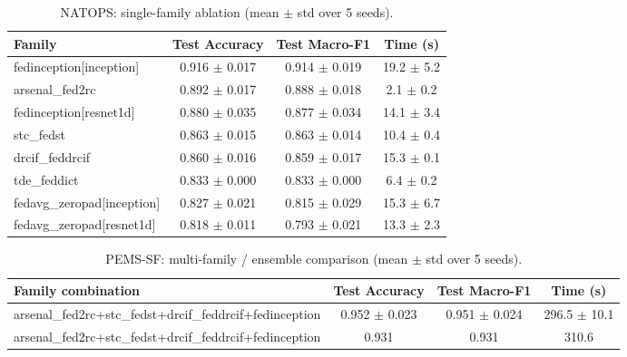 \begin{table}[t]
\centering
\caption{NATOPS: single-family ablation (mean $\pm$ std over 5 seeds).}
\label{tab:results_natops_ablation}
\begin{tabular}{lccc}
\toprule
Family & Test Accuracy & Test Macro-F1 & Time (s) \\
\midrule
fedinception[inception] & 0.916 $\pm$ 0.017 & 0.914 $\pm$ 0.019 & 19.2 $\pm$ 5.2 \\
arsenal\_fed2rc & 0.892 $\pm$ 0.017 & 0.888 $\pm$ 0.018 & 2.1 $\pm$ 0.2 \\
fedinception[resnet1d] & 0.880 $\pm$ 0.035 & 0.877 $\pm$ 0.034 & 14.1 $\pm$ 3.4 \\
stc\_fedst & 0.863 $\pm$ 0.015 & 0.863 $\pm$ 0.014 & 10.4 $\pm$ 0.4 \\
drcif\_feddrcif & 0.860 $\pm$ 0.016 & 0.859 $\pm$ 0.017 & 15.3 $\pm$ 0.1 \\
tde\_feddict & 0.833 $\pm$ 0.000 & 0.833 $\pm$ 0.000 & 6.4 $\pm$ 0.2 \\
fedavg\_zeropad[inception] & 0.827 $\pm$ 0.021 & 0.815 $\pm$ 0.029 & 15.3 $\pm$ 6.7 \\
fedavg\_zeropad[resnet1d] & 0.818 $\pm$ 0.011 & 0.793 $\pm$ 0.021 & 13.3 $\pm$ 2.3 \\
\bottomrule
\end{tabular}
\end{table}

\begin{table}[t]
\centering
\caption{PEMS-SF: multi-family / ensemble comparison (mean $\pm$ std over 5 seeds).}
\label{tab:results_pems-sf_ensemble}
\begin{tabular}{lccc}
\toprule
Family combination & Test Accuracy & Test Macro-F1 & Time (s) \\
\midrule
arsenal\_fed2rc+stc\_fedst+drcif\_feddrcif+fedinception & 0.952 $\pm$ 0.023 & 0.951 $\pm$ 0.024 & 296.5 $\pm$ 10.1 \\
arsenal\_fed2rc+stc\_fedst+drcif\_feddrcif+fedinception & 0.931 & 0.931 & 310.6 \\
\bottomrule
\end{tabular}
\end{table}


